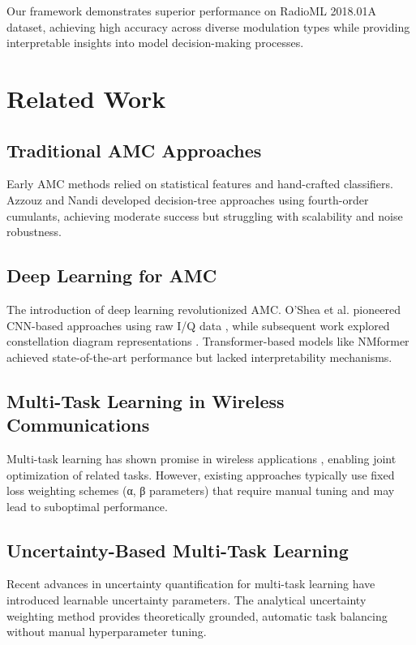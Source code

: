 \documentclass[conference]{IEEEtran}
\begin{document}
Our framework demonstrates superior performance on RadioML 2018.01A dataset, achieving high accuracy across diverse modulation types while providing interpretable insights into model decision-making processes.

\section{Related Work}

\subsection{Traditional AMC Approaches}
Early AMC methods relied on statistical features and hand-crafted classifiers. Azzouz and Nandi \cite{azzouz1995algorithms} developed decision-tree approaches using fourth-order cumulants, achieving moderate success but struggling with scalability and noise robustness.

\subsection{Deep Learning for AMC}
The introduction of deep learning revolutionized AMC. O'Shea et al. pioneered CNN-based approaches using raw I/Q data \cite{oshea2016radio}, while subsequent work explored constellation diagram representations \cite{peng2021survey}. Transformer-based models like NMformer \cite{kong2023nmformer} achieved state-of-the-art performance but lacked interpretability mechanisms.

\subsection{Multi-Task Learning in Wireless Communications}
Multi-task learning has shown promise in wireless applications \cite{jagannath2022multi}, enabling joint optimization of related tasks. However, existing approaches typically use fixed loss weighting schemes (α, β parameters) that require manual tuning and may lead to suboptimal performance.

\subsection{Uncertainty-Based Multi-Task Learning}
Recent advances in uncertainty quantification for multi-task learning \cite{kendall2018multi} have introduced learnable uncertainty parameters. The analytical uncertainty weighting method \cite{liu2024analytical} provides theoretically grounded, automatic task balancing without manual hyperparameter tuning.
\end{document}
